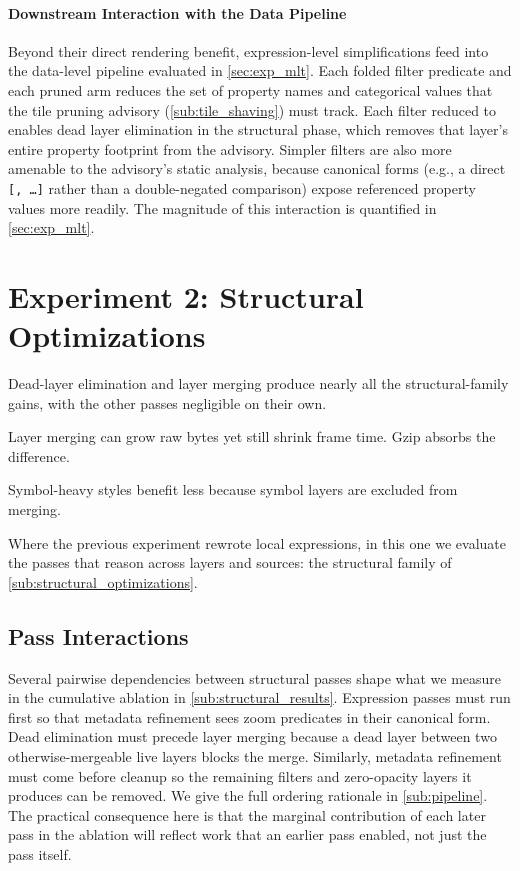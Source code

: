 \paragraph{Downstream Interaction with the Data Pipeline}
Beyond their direct rendering benefit, expression-level simplifications feed into the data-level pipeline evaluated in \cref{sec:exp_mlt}.
Each folded filter predicate and each pruned  arm reduces the set of property names and categorical values that the tile pruning advisory (\cref{sub:tile_shaving}) must track.
Each filter reduced to  enables dead layer elimination in the structural phase, which removes that layer's entire property footprint from the advisory.
Simpler filters are also more amenable to the advisory's static analysis, because canonical forms (e.g., a direct \texttt{[,~\ldots]} rather than a double-negated comparison) expose referenced property values more readily.
The magnitude of this interaction is quantified in \cref{sec:exp_mlt}.

\section{Experiment 2: Structural Optimizations}\label{sec:exp_structural}
\begin{keytakeaways}
\item Dead-layer elimination and layer merging produce nearly all the structural-family gains, with the other passes negligible on their own.
\item Layer merging can grow raw bytes yet still shrink frame time.
Gzip absorbs the difference.
\item Symbol-heavy styles benefit less because symbol layers are excluded from merging.
\end{keytakeaways}

\noindent Where the previous experiment rewrote local expressions, in this one we evaluate the passes that reason across layers and sources: the structural family of \cref{sub:structural_optimizations}.

\subsection{Pass Interactions}\label{sub:structural_interactions}

Several pairwise dependencies between structural passes shape what we measure in the cumulative ablation in \cref{sub:structural_results}.
Expression passes must run first so that metadata refinement sees zoom predicates in their canonical form.
Dead elimination must precede layer merging because a dead layer between two otherwise-mergeable live layers blocks the merge.
Similarly, metadata refinement must come before cleanup so the remaining  filters and zero-opacity layers it produces can be removed.
We give the full ordering rationale in \cref{sub:pipeline}.
The practical consequence here is that the marginal contribution of each later pass in the ablation will reflect work that an earlier pass enabled, not just the pass itself.

